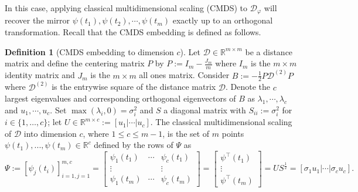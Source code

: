 \documentclass[12pt]{article}
\theoremstyle{definition}
\newtheorem{definition}{Definition}
\newcommand{\R}{\mathbb{R}}
\begin{document}
In this case, applying classical multidimensional scaling (CMDS) to $\mathcal{D}_{\varphi}$ will recover the mirror $\psi(t_1),\psi(t_2),\cdots,\psi(t_m)$ exactly up to an orthogonal transformation. Recall that the CMDS embedding is defined as follows.

\begin{definition}[CMDS embedding to dimension $c$]
\label{def:CMDS}
Let $\mathcal{D} \in \mathbb{R}^{m \times m}$ be a distance matrix and define the centering matrix $P$ by $P:=I_m-\frac{J_m}{m}$ where $I_m$ is the $m \times m$ identity matrix and $J_m$ is the $m \times m$ all ones matrix. Consider $B:=-\frac{1}{2}P\mathcal{D}^{(2)}P$ where $\mathcal{D} ^{(2)}$ is the entrywise square of the distance matrix $\mathcal{D} $. Denote the $c$ largest eigenvalues and corresponding orthogonal eigenvectors of $B$ as $\lambda_1,\cdots,\lambda_c$ and $u_1,\cdots,u_c$. Set $\max(\lambda_i,0)=\sigma^2_i$ and $S$ a diagonal matrix with $S_{ii}:=\sigma^2_i$ for $i \in \{1,\dots,c\}$; let $U \in \R^{m \times c} := [ u_1 | \cdots | u_c ]$. The classical multidimensional scaling of $\mathcal{D}$ into dimension $c$, where $1\leq c\leq m-1$, is the set of $m$ points $\psi(t_1),...,\psi(t_m) \in \mathbb{R}^c$ defined by the rows of $\Psi$ as 
$$
\Psi:=[\psi_{j}(t_i)]_{i=1,j=1}^{m,c}
=\left[
\begin{array}{ccc}
\psi_1(t_1) & \cdots & \psi_c(t_1) \\ 
\vdots &  & \vdots \\ 
\psi_1(t_m) & \cdots & \psi_c(t_m)
\end{array}\right]=
 \left[
 \begin{array}{c}
  \psi^{\top}(t_1) \\ 
 \vdots \\ 
 \psi^{\top}(t_m) 
 \end{array}
 \right]=
US^{\frac{1}{2}}=
\left[ \sigma_1 u_1|\cdots| \sigma_c u_c\right].
$$
\end{definition}
\end{document}
